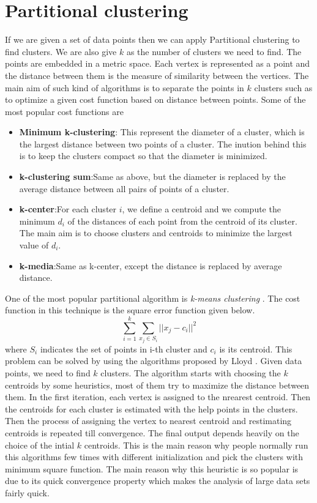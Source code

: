 \documentclass[letterpaper]{article}
\begin{document}
\section{Partitional clustering}
If we are given a set of data points then we can apply Partitional clustering
to find clusters.  We are also give $k$ as the number of clusters we need to
find. The points are embedded in a metric space. Each vertex is represented as
a point and the distance between them is the measure of similarity between the
vertices. The main aim of such kind of algorithms is to separate the points in
$k$ clusters such as to optimize a given cost function based on distance
between points. Some of the most popular cost functions are 

\begin{itemize}
\item \textbf{Minimum k-clustering}: This represent the diameter of a cluster,
which is the largest distance between two points of a cluster. The inution
behind this is to keep the clusters compact so that the diameter is minimized.
\item \textbf{k-clustering sum}:Same as above, but the diameter is replaced by
the average distance between all pairs of points of a cluster.
\item \textbf{k-center}:For each cluster $i$, we define a centroid and we
compute the minimum $d_i$ of the distances of each point from the centroid of
its cluster. The main aim is to choose clusters and centroids to minimize the
largest value of $d_i$. 
\item \textbf{k-media}:Same as k-center, except the distance  is replaced by
average distance.
\end{itemize}

One of the most popular partitional algorithm is \emph{k-means clustering}
\cite{kmeans67}. The cost function in this technique is the square error
function given below. \\ \begin{equation} \sum_{i=1}^k \sum_{x_j \in S_i} ||x_j
- c_i||^2 \end{equation} where $S_i$ indicates the set of points in i-th
  cluster and $c_i$ is its centroid. This problem can be solved by using the
algorithms proposed by Lloyd \cite{loyd82}. Given data points, we need to find
$k$ clusters. The algorithm starts with choosing the $k$ centroids by some
heuristics, most of them try to maximize the distance between them.
In the first iteration, each vertex is assigned to the nrearest centroid. 
Then the centroids for each cluster is estimated with the help points in the
clusters.  Then the process of assigning the vertex to nearest centroid and
restimating centroids is repeated till convergence. The final output depends
heavily on the choice of the intial $k$ centroids. This is the main reason why
people normally run this algorithms few times with different initialization and
pick the clusters with minimum square function. The main reason why this
heuristic is so popular is due to its quick convergence property which makes
the analysis of large data sets fairly quick.
\end{document}
